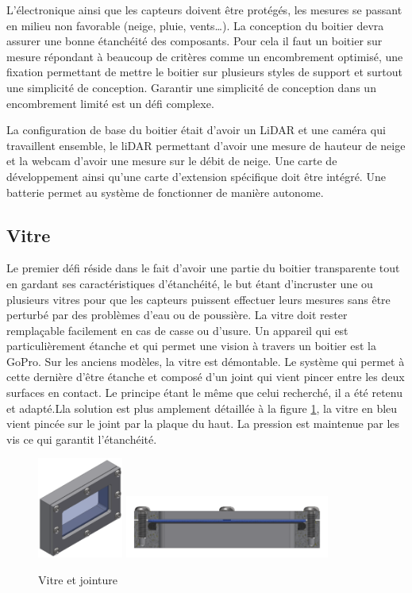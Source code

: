 L’électronique ainsi que les capteurs doivent être protégés, les mesures se passant en milieu non 
favorable (neige, pluie, vents…). La conception du boitier devra assurer une bonne étanchéité des 
composants. Pour cela il faut un boitier sur mesure répondant à beaucoup de critères comme un encombrement 
optimisé, une fixation permettant de mettre le boitier sur plusieurs styles de support et surtout 
une simplicité de conception. Garantir une simplicité de conception dans un encombrement limité est
un défi complexe.\par
La configuration de base du boitier était d’avoir un LiDAR et une caméra qui travaillent ensemble, 
le liDAR permettant d’avoir une mesure de hauteur de neige et la webcam d’avoir une mesure sur le débit 
de neige. Une carte de développement ainsi qu’une carte d'extension spécifique doit être intégré. Une batterie 
permet au système de fonctionner de manière autonome.

\subsection{Vitre}

Le premier défi réside dans le fait d’avoir une partie du boitier transparente tout en gardant ses caractéristiques d'étanchéité, 
le but étant d’incruster une ou plusieurs vitres pour que les capteurs puissent effectuer leurs mesures 
sans être perturbé par des problèmes d’eau ou de poussière. La vitre doit rester remplaçable facilement 
en cas de casse ou d’usure. Un appareil qui est particulièrement étanche et qui permet une vision à 
travers un boitier est la GoPro. Sur les anciens modèles, la vitre est démontable. Le système qui permet 
à cette dernière d’être étanche et composé d’un joint qui vient pincer entre les deux surfaces en contact. 
Le principe étant le même que celui recherché, il a été retenu et adapté.Lla solution est plus 
amplement détaillée à la figure \ref{fig:vitre}, la vitre en bleu vient pincée sur le joint par la plaque du haut. La pression est 
maintenue par les vis ce qui garantit l’étanchéité.

\begin{figure}[H]
    \centering
    \includegraphics[width=0.25\textwidth]{Images/photos_PGA/vitreInv.PNG}
    \includegraphics[width=0.6\textwidth]{Images/photos_PGA/vitreJoint.PNG}
    \caption{Vitre et jointure}
    \label{fig:vitre}
\end{figure}

